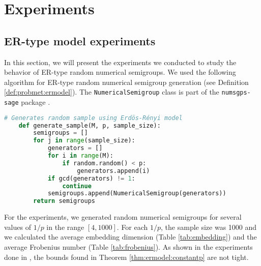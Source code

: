 

\chapter{Experiments}\label{chap:experiments}

\section{ER-type model experiments}

In this section, we will present the experiments we conducted to study the behavior of ER-type random numerical semigroups. We used the following algorithm for ER-type random numerical semigroup generation (see Definition \ref{def:probmet:ermodel}). The \verb|NumericalSemigroup| class is part of the \verb|numsgps-sage| package \cite{oneill2018}.

\begin{lstlisting}[language=Python]
    # Generates random sample using Erdös-Rényi model 
    def generate_sample(M, p, sample_size):
        semigroups = []
        for j in range(sample_size):
            generators = []
            for i in range(M):
                if random.random() < p:
                    generators.append(i)
            if gcd(generators) != 1:
                continue
            semigroups.append(NumericalSemigroup(generators))
        return semigroups
\end{lstlisting}
For the experiments, we generated random numerical semigroups for several values of $1/p$ in the range $[4, 1000]$. For each $1/p$, the sample size was 1000 and we calculated the average embedding dimension (Table \ref{tab:embedding}) and the average Frobenius number (Table \ref{tab:frobenius}). As shown in the experiments done in \cite{de2018random}, the bounds found in Theorem \ref{thm:ermodel:constantp} are not tight. \par 


